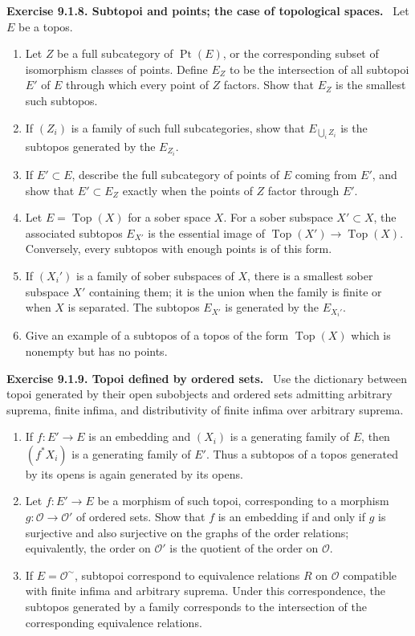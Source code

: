\documentclass[11pt]{article}
\newcommand{\Oo}{\mathcal{O}}
\newcommand{\Top}{\operatorname{Top}}
\newcommand{\Ppoint}{\operatorname{Pt}}
\newenvironment{remarktext}[1]{\par\medskip\noindent\textbf{#1.}\ }{\par\medskip}
\begin{document}
\begin{remarktext}{Exercise 9.1.8. Subtopoi and points; the case of topological spaces}
Let \(E\) be a topos.
\begin{enumerate}[label=\alph*)]
\item Let \(Z\) be a full subcategory of \(\Ppoint(E)\), or the corresponding subset of isomorphism classes of points. Define \(E_Z\) to be the intersection of all subtopoi \(E'\) of \(E\) through which every point of \(Z\) factors. Show that \(E_Z\) is the smallest such subtopos.
\item If \((Z_i)\) is a family of such full subcategories, show that \(E_{\bigcup_iZ_i}\) is the subtopos generated by the \(E_{Z_i}\).
\item If \(E'\subset E\), describe the full subcategory of points of \(E\) coming from \(E'\), and show that \(E'\subset E_Z\) exactly when the points of \(Z\) factor through \(E'\).
\item Let \(E=\Top(X)\) for a sober space \(X\). For a sober subspace \(X'\subset X\), the associated subtopos \(E_{X'}\) is the essential image of \(\Top(X')\to\Top(X)\). Conversely, every subtopos with enough points is of this form.
\item If \((X_i')\) is a family of sober subspaces of \(X\), there is a smallest sober subspace \(X'\) containing them; it is the union when the family is finite or when \(X\) is separated. The subtopos \(E_{X'}\) is generated by the \(E_{X_i'}\).
\item Give an example of a subtopos of a topos of the form \(\Top(X)\) which is nonempty but has no points.
\end{enumerate}
\end{remarktext}

\begin{remarktext}{Exercise 9.1.9. Topoi defined by ordered sets}
Use the dictionary between topoi generated by their open subobjects and ordered sets admitting arbitrary suprema, finite infima, and distributivity of finite infima over arbitrary suprema.
\begin{enumerate}[label=\alph*)]
\item If \(f:E'\to E\) is an embedding and \((X_i)\) is a generating family of \(E\), then \((f^*X_i)\) is a generating family of \(E'\). Thus a subtopos of a topos generated by its opens is again generated by its opens.
\item Let \(f:E'\to E\) be a morphism of such topoi, corresponding to a morphism \(g:\Oo\to\Oo'\) of ordered sets. Show that \(f\) is an embedding if and only if \(g\) is surjective and also surjective on the graphs of the order relations; equivalently, the order on \(\Oo'\) is the quotient of the order on \(\Oo\).
\item If \(E=\Oo^\sim\), subtopoi correspond to equivalence relations \(R\) on \(\Oo\) compatible with finite infima and arbitrary suprema. Under this correspondence, the subtopos generated by a family corresponds to the intersection of the corresponding equivalence relations.
\end{enumerate}
\end{remarktext}
\end{document}
